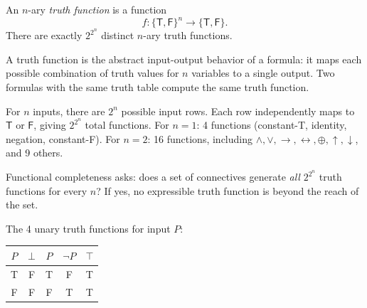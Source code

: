 \vspace{1em}

\begin{tcolorbox}[colback=propbox, colframe=propborder, arc=2pt,
  left=6pt, right=6pt, top=4pt, bottom=4pt,
  title={\small\textbf{Definition (Truth Function)}},
  fonttitle=\small\bfseries]
\label{def:truth-fn}
An $n$-ary \emph{truth function} is a function
\[
f : \{\mathsf{T}, \mathsf{F}\}^n \to \{\mathsf{T}, \mathsf{F}\}.
\]
There are exactly $2^{2^n}$ distinct $n$-ary truth functions.
\end{tcolorbox}

\begin{remark}
A truth function is the abstract input-output behavior of a formula: it maps
each possible combination of truth values for $n$ variables to a single output.
Two formulas with the same truth table compute the same truth function.
\end{remark}

\begin{remark}[Counting]
For $n$ inputs, there are $2^n$ possible input rows. Each row independently
maps to $\mathsf{T}$ or $\mathsf{F}$, giving $2^{2^n}$ total functions.
For $n=1$: 4 functions (constant-T, identity, negation, constant-F).
For $n=2$: 16 functions, including $\wedge, \vee, \rightarrow, \leftrightarrow, \oplus, \uparrow, \downarrow$, and 9 others.
\end{remark}

\begin{remark}[Consequence]
Functional completeness asks: does a set of connectives generate \emph{all}
$2^{2^n}$ truth functions for every $n$? If yes, no expressible truth function
is beyond the reach of the set.
\end{remark}

\begin{example}
The 4 unary truth functions for input $P$:
\begin{center}
\renewcommand{\arraystretch}{1.2}
\begin{tabular}{c|cccc}
\toprule
$P$ & $\bot$ & $P$ & $\neg P$ & $\top$ \\
\midrule
T & F & T & F & T \\
F & F & F & T & T \\
\bottomrule
\end{tabular}
\end{center}
\end{example}

